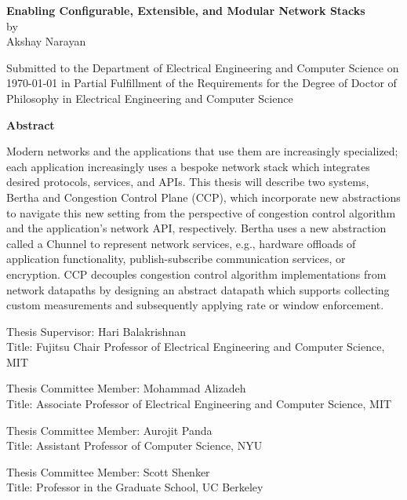 \documentclass[fontsize=12pt,paper=letter]{scrartcl}
\begin{document}
\begin{titlepage}
  \begin{center}
    \textbf{\large Enabling Configurable, Extensible, and Modular Network Stacks}\\
    \vspace{0.3\baselineskip}
    by\\
    \vspace{0.3\baselineskip}
    {\large Akshay Narayan}\\
    \vspace{0.4\baselineskip}
    \begin{addmargin}[0.5in]{0.5in}
      \centering
      Submitted to the Department of Electrical Engineering and Computer Science
      on \today{} in Partial Fulfillment of the Requirements for the Degree of
      Doctor of Philosophy in Electrical Engineering and Computer Science
    \end{addmargin}
  \end{center}

  \begin{flushleft}
  \textbf{Abstract}
  \vspace{0.5\baselineskip}

Modern networks and the applications that use them are increasingly specialized; each application increasingly uses a bespoke network stack which integrates desired protocols, services, and APIs. This thesis will describe two systems, Bertha and Congestion Control Plane (CCP), which incorporate new abstractions to navigate this new setting from the perspective of congestion control algorithm and the application's network API, respectively.
Bertha uses a new abstraction called a Chunnel to represent network services, e.g., hardware offloads of application functionality, publish-subscribe communication services, or encryption.
CCP decouples congestion control algorithm implementations from network datapaths by designing an abstract datapath which supports collecting custom measurements and subsequently applying rate or window enforcement.

  \bigskip

  \vspace{0.5\baselineskip}
  Thesis Supervisor: Hari Balakrishnan\\
  Title: Fujitsu Chair Professor of Electrical Engineering and Computer Science, MIT

  \vspace{0.2\baselineskip}

  Thesis Committee Member: Mohammad Alizadeh\\
  Title: Associate Professor of Electrical Engineering and Computer Science, MIT
  
  \vspace{0.2\baselineskip}
  Thesis Committee Member: Aurojit Panda\\
  Title: Assistant Professor of Computer Science, NYU

  \vspace{0.2\baselineskip}
  Thesis Committee Member: Scott Shenker\\
  Title: Professor in the Graduate School, UC Berkeley
  \end{flushleft}
\end{titlepage}
\end{document}

